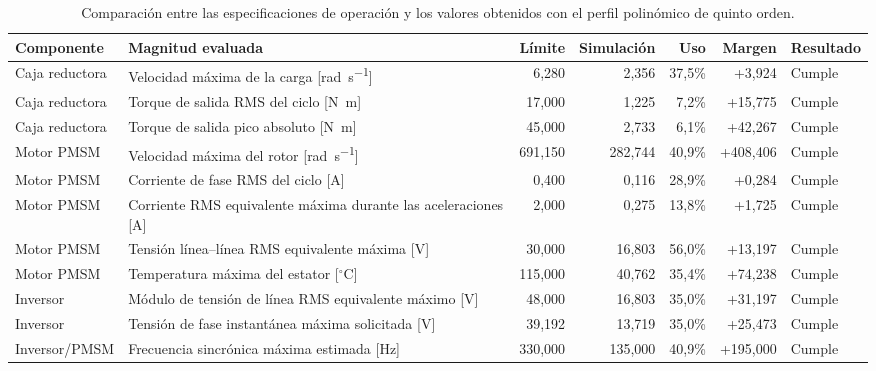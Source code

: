 \documentclass[10pt,a4paper]{article}
\begin{document}
\begin{table}[htbp]
	\centering
	\caption{Comparación entre las especificaciones de operación y los valores obtenidos con el perfil polinómico de quinto orden.}
	\label{tab:limites_operacion_4a_quintico}
	\scriptsize
	\setlength{\tabcolsep}{3.5pt}
	\begin{tabularx}{\textwidth}{@{}lXrrrrl@{}}
		\toprule
		\textbf{Componente} & \textbf{Magnitud evaluada} &
		\textbf{Límite} & \textbf{Simulación} &
		\textbf{Uso} & \textbf{Margen} & \textbf{Resultado} \\
		\midrule
		Caja reductora & Velocidad máxima de la carga [\si{\radian\per\second}] &
		6,280 & 2,356 & 37,5\% & +3,924 & Cumple \\
		
		Caja reductora & Torque de salida RMS del ciclo [\si{\newton\metre}] &
		17,000 & 1,225 & 7,2\% & +15,775 & Cumple \\
		
		Caja reductora & Torque de salida pico absoluto [\si{\newton\metre}] &
		45,000 & 2,733 & 6,1\% & +42,267 & Cumple \\
		
		Motor PMSM & Velocidad máxima del rotor [\si{\radian\per\second}] &
		691,150 & 282,744 & 40,9\% & +408,406 & Cumple \\
		
		Motor PMSM & Corriente de fase RMS del ciclo [\si{\ampere}] &
		0,400 & 0,116 & 28,9\% & +0,284 & Cumple \\
		
		Motor PMSM & Corriente RMS equivalente máxima durante las aceleraciones [\si{\ampere}] &
		2,000 & 0,275 & 13,8\% & +1,725 & Cumple \\
		
		Motor PMSM & Tensión línea--línea RMS equivalente máxima [\si{\volt}] &
		30,000 & 16,803 & 56,0\% & +13,197 & Cumple \\
		
		Motor PMSM & Temperatura máxima del estator [$^\circ$C] &
		115,000 & 40,762 & 35,4\% & +74,238 & Cumple \\
		
		Inversor & Módulo de tensión de línea RMS equivalente máximo [\si{\volt}] &
		48,000 & 16,803 & 35,0\% & +31,197 & Cumple \\
		
		Inversor & Tensión de fase instantánea máxima solicitada [\si{\volt}] &
		39,192 & 13,719 & 35,0\% & +25,473 & Cumple \\
		
		Inversor/PMSM & Frecuencia sincrónica máxima estimada [\si{\hertz}] &
		330,000 & 135,000 & 40,9\% & +195,000 & Cumple \\
		\bottomrule
	\end{tabularx}
\end{table}
\end{document}
